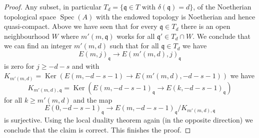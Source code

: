 \documentclass[10pt,a4paper]{amsart}
\theoremstyle{plain}
\theoremstyle{definition}
\theoremstyle{remark}
\numberwithin{equation}{subsection}
\def\Spec{\mathop{\mathrm{Spec}}}
\def\Ker{\mathop{\mathrm{Ker}}}
\begin{document}
\begin{proof}
\medskip\noindent
Any subset, in particular
$T_d = \{\mathfrak q \in T \text{ with }\delta(\mathfrak q) = d\}$,
of the Noetherian topological space $\Spec(A)$
with the endowed topology is Noetherian and hence quasi-compact.
Above we have seen that for every $\mathfrak q \in T_d$
there is an open neighbourhood $W$ where
$m'(m, \mathfrak q)$ works for all $\mathfrak q' \in T_d \cap W$.
We conclude that we can find an integer $m'(m, d)$ such that for all
$\mathfrak q \in T_d$ we have
$$
E(m, j)_\mathfrak q \to E(m'(m, d), j)_\mathfrak q
$$
is zero for $j \geq -d - s$ and with
$K_{m'(m, d)} = \Ker(E(m, -d - s - 1) \to E(m'(m, d), -d - s - 1))$
we have
$$
K_{m'(m, d), \mathfrak q} =
\Ker(E(m, -d - s - 1)_{\mathfrak q} \to E(k, -d - s - 1)_{\mathfrak q})
$$
for all $k \geq m'(m, d)$ and the map
$$
E(0, -d - s - 1)_\mathfrak q \to
E(m, -d - s - 1)_\mathfrak q/K_{m'(m, d), \mathfrak q}
$$
is surjective. Using the local duality theorem again (in the opposite
direction) we conclude that the claim is correct. This finishes the proof.
\end{proof}
\end{document}
